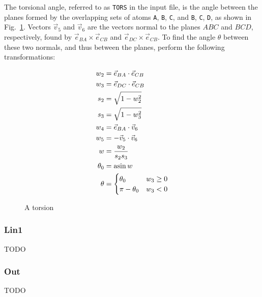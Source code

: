 \documentclass{article}
\begin{document}
The torsional angle, referred to as \verb|TORS| in the input file, is the angle
between the planes formed by the overlapping sets of atoms \verb|A|, \verb|B|,
\verb|C|, and \verb|B|, \verb|C|, \verb|D|, as shown in Fig.~\ref{fig:tors}.
Vectors $\vec{v}_5$ and $\vec{v}_6$ are the vectors normal to the planes $ABC$
and $BCD$, respectively, found by $\vec{e}_{BA} \times \vec{e}_{CB}$ and
$\vec{e}_{DC} \times \vec{e}_{CB}$. To find the angle $\theta$ between these two
normals, and thus between the planes, perform the following transformations:

\begin{align}
  w_2 &= \vec{e}_{BA} \cdot \vec{e}_{CB} \\
  w_3 &= \vec{e}_{DC} \cdot \vec{e}_{CB} \\
  s_2 &= \sqrt{1 - w_2^2} \\
  s_3 &= \sqrt{1 - w_3^2} \\
  w_4 &= \vec{e}_{BA} \cdot \vec{v}_{6} \\
  w_5 &= -\vec{v}_5 \cdot \vec{v}_6 \\
  w &= \frac{w_2}{s_2 s_3} \\
  \theta_0 &= \asin w \\
  \theta &= \begin{cases}
              \theta_0 & w_3 \geq 0 \\
              \pi - \theta_0 & w_3 < 0
            \end{cases}
\end{align}

\begin{figure}[ht]
  \centering
  \caption{A torsion}
  \label{fig:tors}

\end{figure}

\subsubsection{Lin1}
\label{sec:lin1}

TODO

\subsubsection{Out}
\label{sec:out}

TODO
\end{document}
